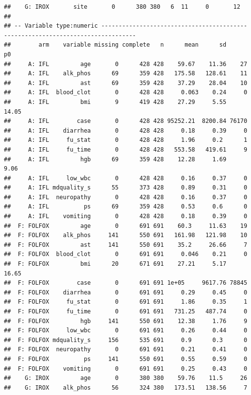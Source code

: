 \documentclass[fleqn,10pt,lineno]{wlpeerj} %
\begin{document}
\begin{verbatim}
##    G: IROX       site       0      380 380   6  11     0       12
## 
## -- Variable type:numeric --------------------------------------------------------------------------------
##        arm    variable missing complete   n      mean      sd       p0
##     A: IFL         age       0      428 428    59.67    11.36    27   
##     A: IFL    alk_phos      69      359 428   175.58   128.61    11   
##     A: IFL         ast      69      359 428    37.29    28.04    10   
##     A: IFL  blood_clot       0      428 428     0.063    0.24     0   
##     A: IFL         bmi       9      419 428    27.29     5.55    14.05
##     A: IFL        case       0      428 428 95252.21  8200.84 76170   
##     A: IFL    diarrhea       0      428 428     0.18     0.39     0   
##     A: IFL     fu_stat       0      428 428     1.96     0.2      1   
##     A: IFL     fu_time       0      428 428   553.58   419.61     9   
##     A: IFL         hgb      69      359 428    12.28     1.69     9.06
##     A: IFL     low_wbc       0      428 428     0.16     0.37     0   
##     A: IFL mdquality_s      55      373 428     0.89     0.31     0   
##     A: IFL  neuropathy       0      428 428     0.16     0.37     0   
##     A: IFL          ps      69      359 428     0.53     0.6      0   
##     A: IFL    vomiting       0      428 428     0.18     0.39     0   
##  F: FOLFOX         age       0      691 691    60.3     11.63    19   
##  F: FOLFOX    alk_phos     141      550 691   161.98   121.98    10   
##  F: FOLFOX         ast     141      550 691    35.2     26.66     7   
##  F: FOLFOX  blood_clot       0      691 691     0.046    0.21     0   
##  F: FOLFOX         bmi      20      671 691    27.21     5.17    16.65
##  F: FOLFOX        case       0      691 691 1e+05     9617.76 78845   
##  F: FOLFOX    diarrhea       0      691 691     0.29     0.45     0   
##  F: FOLFOX     fu_stat       0      691 691     1.86     0.35     1   
##  F: FOLFOX     fu_time       0      691 691   731.25   487.74     0   
##  F: FOLFOX         hgb     141      550 691    12.38     1.76     9   
##  F: FOLFOX     low_wbc       0      691 691     0.26     0.44     0   
##  F: FOLFOX mdquality_s     156      535 691     0.9      0.3      0   
##  F: FOLFOX  neuropathy       0      691 691     0.21     0.41     0   
##  F: FOLFOX          ps     141      550 691     0.55     0.59     0   
##  F: FOLFOX    vomiting       0      691 691     0.25     0.43     0   
##    G: IROX         age       0      380 380    59.76    11.5     26   
##    G: IROX    alk_phos      56      324 380   173.51   138.56     7   

\end{verbatim}
\end{document}
